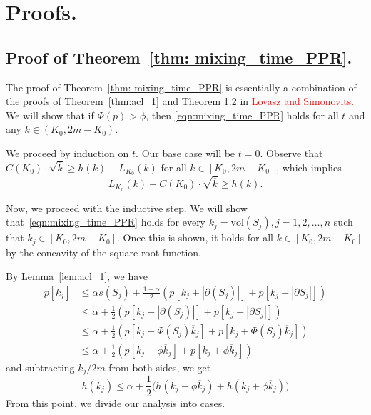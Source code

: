 \documentclass{article}
\newcommand{\abs}[1]{\left \lvert #1 \right \rvert}
\newcommand{\vol}{\mathrm{vol}}
\newcommand{\1}{\mathbf{1}}
\theoremstyle{alden}
\theoremstyle{aldenthm}
\theoremstyle{remark}
\begin{document}
\section{Proofs.}

\subsection{Proof of Theorem~\ref{thm: mixing_time_PPR}.}
The proof of Theorem~\ref{thm: mixing_time_PPR} is essentially a combination of the proofs of Theorem~\ref{thm:acl_1} and Theorem 1.2 in \textcolor{red}{Lovasz and Simonovits.} We will show that if $\Phi(p) > \phi$, then \eqref{eqn:mixing_time_PPR} holds for all $t$ and any $k \in (K_0,2m - K_0)$.

We proceed by induction on $t$. Our base case will be $t = 0$. Observe that $C(K_0) \cdot \sqrt{\overline{k}} \geq  h(k) - L_{K_0}(k)$ for all $k \in [K_0,2m - K_0]$, which implies
\begin{equation*}
L_{K_0}(k) + C(K_0) \cdot \sqrt{\overline{k}} \geq h(k).
\end{equation*}

Now, we proceed with the inductive step. We will show that~\eqref{eqn:mixing_time_PPR} holds for every $k_j = \vol(S_j), j = 1,2,\ldots,n$ such that $k_j \in [K_0, 2m - K_0]$. Once this is shown, it holds for all $k \in [K_0,2m - K_0]$ by the concavity of the square root function.

By Lemma~\ref{lem:acl_1}, we have
\begin{align}
p[k_j] & \leq \alpha s(S_j) + \frac{1 - \alpha}{2} \left(p[k_j +  \abs{\partial(S_j)}] + p[k_j - \abs{\partial{S_j}}]  \right) \nonumber \\
& \leq \alpha + \frac{1}{2}  \left(p[k_j - \abs{\partial(S_j)}] + p[k_j + \abs{\partial{S_j}}]  \right) \nonumber\\
& \leq \alpha + \frac{1}{2} \left(p[k_j - \Phi(S_j) \overline{k}_j] + p[k_j + \Phi(S_j) \overline{k}_j]  \right) \nonumber \\
& \leq \alpha + \frac{1}{2} \left(p[k_j - \phi \overline{k}_j] + p[k_j + \phi \overline{k}_j]\right) \nonumber
\end{align}
and subtracting $k_j/2m$ from both sides, we get
\begin{equation}
\label{eqn:mixing_time_PPR_pf1}
h(k_j) \leq \alpha + \frac{1}{2} \bigl(h(k_j - \phi \overline{k}_j) + h(k_j +  \phi \overline{k}_j) \bigr)
\end{equation}
From this point, we divide our analysis into cases. 
\end{document}
